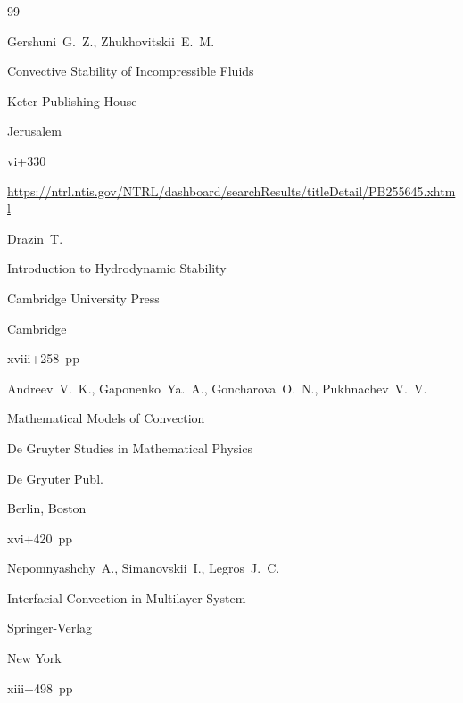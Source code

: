 \begin{thebibliography}{99}




\by Gershuni~G.~Z., Zhukhovitskii~E.~M.

\book Convective Stability of Incompressible Fluids


\publ Keter Publishing House

\publaddr Jerusalem

\totalpages vi+330

\elink \url{https://ntrl.ntis.gov/NTRL/dashboard/searchResults/titleDetail/PB255645.xhtml}




\by Drazin~T.

\book Introduction to Hydrodynamic Stability


\publ Cambridge University Press

\publaddr Cambridge

\totalpages xviii+258~pp \nofrills





\by Andreev~V.~K., Gaponenko~Ya.~A., Goncharova~O.~N., Pukhnachev~V.~V.

\book Mathematical Models of Convection


\serial De Gruyter Studies in Mathematical Physics 


\publ De Gryuter Publ.

\publaddr Berlin, Boston

\totalpages xvi+420~pp \nofrills





\by Nepomnyashchy~A., Simanovskii~I., Legros~J.~C. 

\book Interfacial Convection in Multilayer System


\publ Springer-Verlag

\publaddr New York

\totalpages xiii+498~pp \nofrills


\end{thebibliography}
